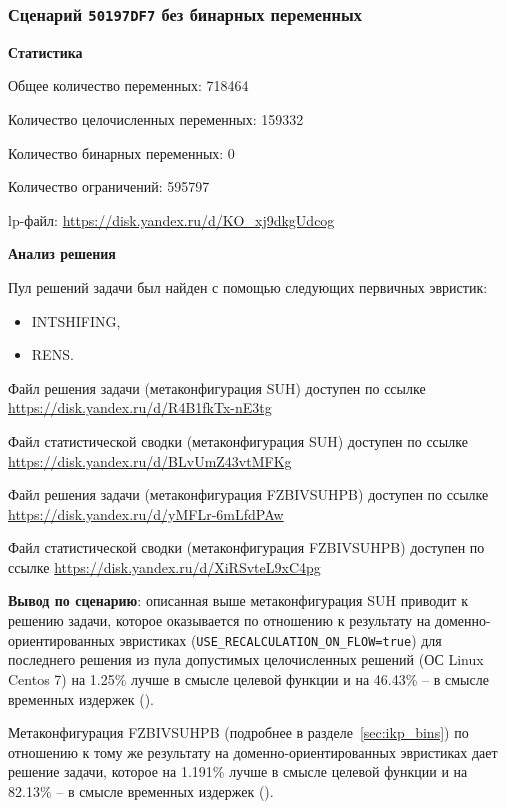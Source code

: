 \documentclass[%
	11pt,
	a4paper,
	utf8,
		]{article}
\begin{document}
\subsubsection{Сценарий \texttt{50197DF7} без бинарных переменных}

\textbf{Статистика}\vspace*{1mm}

Общее количество переменных: 718464

Количество целочисленных переменных: 159332

Количество бинарных переменных: 0

Количество ограничений: 595797

lp-файл: \url{https://disk.yandex.ru/d/KO_xj9dkgUdcog}

\vspace*{5mm}\textbf{Анализ решения}\vspace*{1mm}

Пул решений задачи был найден с помощью следующих первичных эвристик:
\begin{itemize}
	\item INTSHIFING,
	
	\item RENS.
\end{itemize}

Файл решения задачи (метаконфигурация SUH) доступен по ссылке \url{https://disk.yandex.ru/d/R4B1fkTx-nE3tg}

Файл статистической сводки (метаконфигурация SUH) доступен по ссылке \url{https://disk.yandex.ru/d/BLvUmZ43vtMFKg}

Файл решения задачи (метаконфигурация FZBIVSUHPB) доступен по ссылке \url{https://disk.yandex.ru/d/yMFLr-6mLfdPAw}

Файл статистической сводки (метаконфигурация FZBIVSUHPB) доступен по ссылке \url{https://disk.yandex.ru/d/XiRSvteL9xC4pg}

\vspace*{3mm}
\textbf{Вывод по сценарию}: описанная выше метаконфигурация SUH приводит к решению задачи, которое оказывается по отношению к результату на доменно-ориентированных эвристиках (\verb|USE_RECALCULATION_ON_FLOW=true|) для последнего решения из пула допустимых целочисленных решений (ОС Linux Centos 7) на 1.25\% лучше в смысле целевой функции и на 46.43\% -- в смысле временных издержек (). 

Метаконфигурация FZBIVSUHPB (подробнее в разделе~\ref{sec:ikp_bins}) по отношению к тому же результату на доменно-ориентированных эвристиках дает решение задачи, которое на 1.191\% лучше в смысле целевой функции и на 82.13\% -- в смысле временных издержек ().
\end{document}
